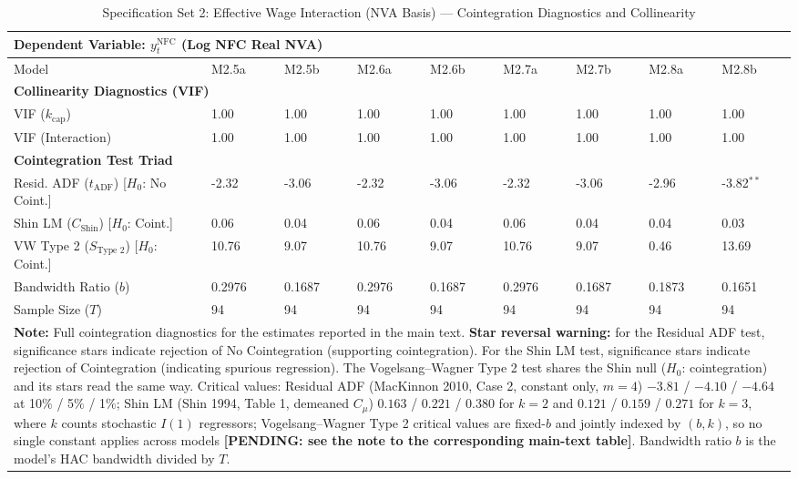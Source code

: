 \begin{table}[H]
\centering
\setlength{\tabcolsep}{2.5pt}
\caption{Specification Set 2: Effective Wage Interaction (NVA Basis) --- Cointegration Diagnostics and Collinearity}
\label{tab:specA_set2_nva_triad}
\scriptsize
\begin{tabular}{p{3.8cm}p{1.1cm}p{1.1cm}p{1.1cm}p{1.1cm}p{1.1cm}p{1.1cm}p{1.1cm}p{1.1cm}}
\toprule
\multicolumn{9}{l}{\textbf{Dependent Variable: $y_t^{\text{NFC}}$ (Log NFC Real NVA)}} \\
\midrule
Model & M2.5a & M2.5b & M2.6a & M2.6b & M2.7a & M2.7b & M2.8a & M2.8b \\
\midrule
\multicolumn{9}{l}{\textbf{Collinearity Diagnostics (VIF)}} \\
VIF ($k_{\text{cap}}$) & 1.00 & 1.00 & 1.00 & 1.00 & 1.00 & 1.00 & 1.00 & 1.00 \\
VIF (Interaction) & 1.00 & 1.00 & 1.00 & 1.00 & 1.00 & 1.00 & 1.00 & 1.00 \\
\midrule
\multicolumn{9}{l}{\textbf{Cointegration Test Triad}} \\
Resid. ADF ($t_{\text{ADF}}$) [$H_0$: No Coint.] & -2.32 & -3.06 & -2.32 & -3.06 & -2.32 & -3.06 & -2.96 & -3.82$^{**}$ \\
Shin LM ($C_{\text{Shin}}$) [$H_0$: Coint.] & 0.06 & 0.04 & 0.06 & 0.04 & 0.06 & 0.04 & 0.04 & 0.03 \\
VW Type 2 ($S_{\text{Type 2}}$) [$H_0$: Coint.] & 10.76 & 9.07 & 10.76 & 9.07 & 10.76 & 9.07 & 0.46 & 13.69 \\
\midrule
Bandwidth Ratio ($b$) & 0.2976 & 0.1687 & 0.2976 & 0.1687 & 0.2976 & 0.1687 & 0.1873 & 0.1651 \\
Sample Size ($T$) & 94 & 94 & 94 & 94 & 94 & 94 & 94 & 94 \\
\bottomrule
\multicolumn{9}{p{14.5cm}}{\footnotesize \textbf{Note:} Full cointegration diagnostics for the estimates reported in the main text. \textbf{Star reversal warning:} for the Residual ADF test, significance stars indicate rejection of No Cointegration (supporting cointegration). For the Shin LM test, significance stars indicate rejection of Cointegration (indicating spurious regression). The Vogelsang--Wagner Type 2 test shares the Shin null ($H_0$: cointegration) and its stars read the same way. Critical values: Residual ADF (MacKinnon 2010, Case 2, constant only, $m=4$) $-3.81$ / $-4.10$ / $-4.64$ at 10\% / 5\% / 1\%; Shin LM (Shin 1994, Table 1, demeaned $C_\mu$) $0.163$ / $0.221$ / $0.380$ for $k=2$ and $0.121$ / $0.159$ / $0.271$ for $k=3$, where $k$ counts stochastic $I(1)$ regressors; Vogelsang--Wagner Type 2 critical values are fixed-$b$ and jointly indexed by $(b, k)$, so no single constant applies across models \textbf{[PENDING: see the note to the corresponding main-text table]}. Bandwidth ratio $b$ is the model's HAC bandwidth divided by $T$.} \\
\end{tabular}
\end{table}
